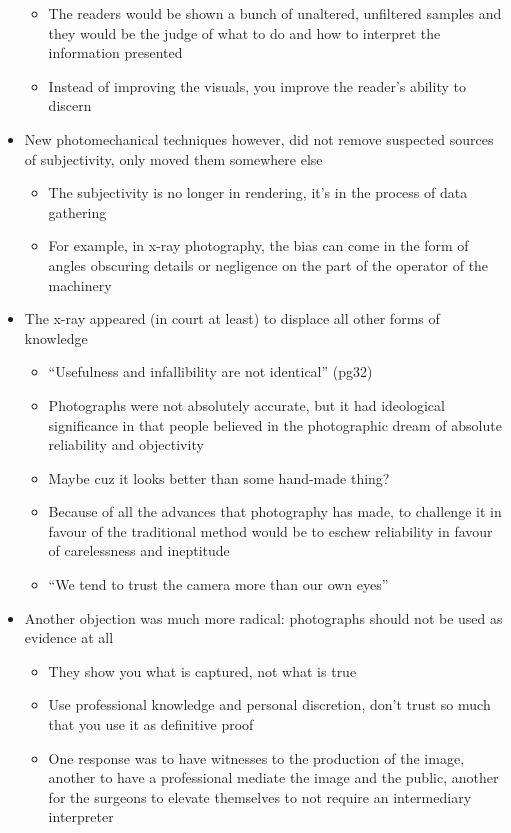 \documentclass[a4paper]{article}
\begin{document}
\begin{itemize}
\begin{itemize}[label=$\circ$]
		\item The readers would be shown a bunch of unaltered, unfiltered samples and they would be the judge of what to do and how to interpret the information presented
		\item Instead of improving the visuals, you improve the reader's ability to discern
	\end{itemize}
	\item New photomechanical techniques however, did not remove suspected sources of subjectivity, only moved them somewhere else
	\begin{itemize}[label=$\circ$]
		\item The subjectivity is no longer in rendering, it's in the process of data gathering
		\item For example, in x-ray photography, the bias can come in the form of angles obscuring details or negligence on the part of the operator of the machinery
	\end{itemize}
	\item The x-ray appeared (in court at least) to displace all other forms of knowledge 
	\begin{itemize}[label=$\circ$]
		\item ``Usefulness and infallibility are not identical'' (pg32)
		\item Photographs were not absolutely accurate, but it had ideological significance in that people believed in the photographic dream of absolute reliability and objectivity
		\item Maybe cuz it looks better than some hand-made thing?
		\item Because of all the advances that photography has made, to challenge it in favour of the traditional method would be to eschew reliability in favour of carelessness and ineptitude
		\item ``We tend to trust the camera more than our own eyes''
	\end{itemize} 
	\newpage
	\item Another objection was much more radical: photographs should not be used as evidence at all
	\begin{itemize}[label=$\circ$]
		\item They show you what is captured, not what is true
		\item Use professional knowledge and personal discretion, don’t trust so much that you use it as definitive proof
		\item One response was to have witnesses to the production of the image, another to have a professional mediate the image and the public, another for the surgeons to elevate themselves to not require an intermediary interpreter

\end{itemize}
\end{itemize}
\end{document}
